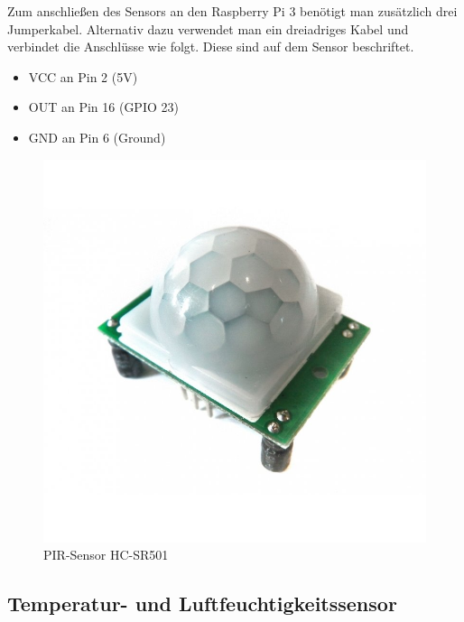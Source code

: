 Zum anschließen des Sensors an den Raspberry Pi 3 benötigt man zusätzlich drei Jumperkabel. Alternativ dazu verwendet man ein dreiadriges Kabel und verbindet die Anschlüsse wie folgt. Diese sind auf dem Sensor beschriftet. 
\begin{center}
	\begin{singlespace}
		\begin{itemize}
			\item VCC an Pin 2 (5V)
			\item OUT an Pin 16 (GPIO 23)
			\item GND an Pin 6 (Ground)
		\end{itemize}
	\end{singlespace}
\end{center} 
\begin{figure}[H]
	\includegraphics[trim=20mm 20mm 20mm 20mm, scale=0.2]{bilder/PIR-Sensor.jpg}
	\caption{PIR-Sensor HC-SR501}
\end{figure}

\subsection{Temperatur- und Luftfeuchtigkeitssensor}


\newpage
